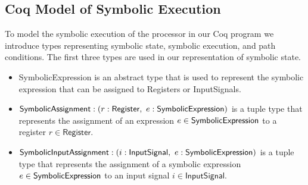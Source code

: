 






\subsection{Coq Model of Symbolic Execution}
To model the symbolic execution of the processor in our Coq program we introduce
types representing symbolic state, symbolic
execution, and path conditions. The first three types are used in our
representation of symbolic state. 
\begin{itemize}
  \item \textsf{SymbolicExpression} is an abstract type that is used to
    represent the symbolic expression that can be assigned to \textsf{Register}s
    or \textsf{InputSignal}s.
  \item $\textsf{SymbolicAssignment} : (r: \textsf{Register},~
    e: \textsf{SymbolicExpression})$ is a tuple type that
    represents the assignment of an expression $e \in
    \textsf{SymbolicExpression}$ to a register $r \in \textsf{Register}$.
  \item $\textsf{SymbolicInputAssignment} : (i: \textsf{InputSignal},~
    e: \textsf{SymbolicExpression})$ is a tuple type that
    represents the assignment of a symbolic expression $e \in
    \textsf{SymbolicExpression}$ to an input signal $i \in \textsf{InputSignal}$.
\end{itemize}

